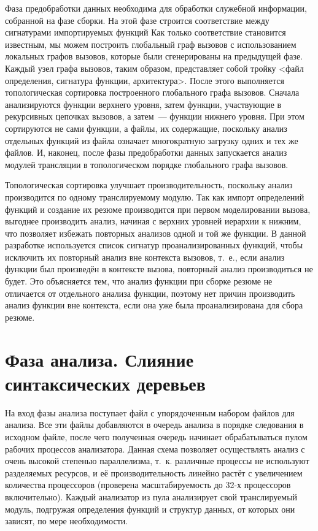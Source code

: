 Фаза предобработки данных необходима для обработки служебной информации, собранной на фазе сборки. На этой фазе строится соответствие между сигнатурами импортируемых функций Как только соответствие становится известным, мы можем построить глобальный граф вызовов с использованием локальных графов вызовов, которые были сгенерированы на предыдущей фазе. Каждый узел графа вызовов, таким образом, представляет собой тройку <файл определения, сигнатура функции, архитектура>. После этого выполняется топологическая сортировка построенного глобального графа вызовов. Сначала анализируются функции верхнего уровня, затем функции, участвующие в рекурсивных цепочках вызовов, а затем~--- функции нижнего уровня. При этом сортируются не сами функции, а файлы, их содержащие, поскольку анализ отдельных функций из файла означает многократную загрузку одних и тех же файлов. И, наконец, после фазы предобработки данных запускается анализ модулей трансляции в топологическом порядке глобального графа вызовов.

Топологическая сортировка улучшает производительность, поскольку анализ производится по одному транслируемому модулю. Так как импорт определений функций и создание их резюме производится при первом моделировании вызова, выгоднее производить анализ, начиная с верхних уровней иерархии к нижним, что позволяет избежать повторных анализов одной и той же функции. В данной разработке используется список сигнатур проанализированных функций, чтобы исключить их повторный анализ вне контекста вызовов, т.~е., если анализ функции был произведён в контексте вызова, повторный анализ производиться не будет. Это объясняется тем, что анализ функции при сборке резюме не отличается от отдельного анализа функции, поэтому нет причин производить анализ функции вне контекста, если она уже была проанализирована для сбора резюме.

\section{Фаза анализа. Слияние синтаксических деревьев}

На вход фазы анализа поступает файл с упорядоченным набором файлов для анализа. Все эти файлы добавляются в очередь анализа в порядке следования в исходном файле, после чего полученная очередь начинает обрабатываться пулом рабочих процессов анализатора. Данная схема позволяет осуществлять анализ с очень высокой степенью параллелизма, т.~к. различные процессы не используют разделяемых ресурсов, и её производительность линейно растёт с увеличением количества процессоров (проверена масштабируемость до 32-х процессоров включительно). Каждый анализатор из пула анализирует свой транслируемый модуль, подгружая определения функций и структур данных, от которых они зависят, по мере необходимости.


